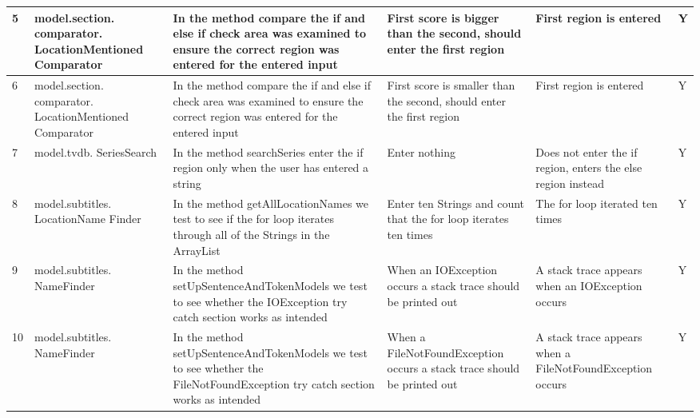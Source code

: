 \begin{center}
\begin{tabular}{| p{18pt} | p{90pt}| p{78pt}| p{75pt} | p{62pt} | p{35pt} |}
\hline
5 & model.section. \newline comparator. \newline LocationMentioned \newline Comparator & In the method compare the if and else if check area was 
examined to ensure the correct region was entered for the entered input & First score is bigger than the second, should enter the first region
 & First region is entered & Y\\ \hline
6 & model.section. \newline comparator. \newline LocationMentioned \newline Comparator & In the method compare the if and else if check area was 
examined to ensure the correct region was entered for the entered input & First score is smaller than the second, should enter the first region
 & First region is entered & Y\\ \hline
7 & model.tvdb. \newline SeriesSearch & In the method searchSeries enter the if region only when the user has entered a 
string & Enter nothing & Does not enter the if region, enters the else region instead & Y\\ \hline
8 & model.subtitles. \newline LocationName \newline Finder & In the
method getAllLocationNames we test to see if the for loop iterates through all
of the Strings in the ArrayList & Enter ten Strings and count that the for loop
iterates ten times & The for loop iterated ten times & Y\\ \hline
9 & model.subtitles. \newline NameFinder & In the method
setUpSentenceAndTokenModels we test to see whether the IOException try catch
section works as intended & When an IOException occurs a stack trace should be
printed out & A stack trace appears when an IOException occurs & Y\\ \hline
10 & model.subtitles. \newline NameFinder & In the method
setUpSentenceAndTokenModels we test to see whether the FileNotFoundException try
catch section works as intended & When a FileNotFoundException occurs a stack
trace should be printed out & A stack trace appears when a FileNotFoundException
occurs & Y\\ \hline
\end{tabular}
\end{center}

